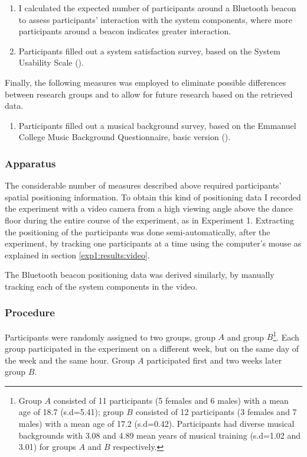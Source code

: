 \documentclass[a4paper,11pt]{article}
\begin{document}
{\begin{enumerate}[resume]
	\item \label{measure:system} I calculated the expected number of participants around a Bluetooth beacon to assess participants' interaction with the system components, where more participants around a beacon indicates greater interaction.
	\item \label{measure:survey:usability} Participants filled out a system satisfaction survey, based on the System Usability Scale (\cite{brooke96}).
\end{enumerate}
Finally, the following measures was employed to eliminate possible differences between research groups and to allow for future research based on the retrieved data.
\begin{enumerate}[resume]
	\item \label{measure:survey:musical} Participants filled out a musical background survey, based on the Emmanuel College Music Background Questionnaire, basic version (\cite{web:zhao12}).
\end{enumerate}

\subsubsection{Apparatus}\label{aparatus}

The considerable number of measures described above required participants' spatial positioning information.
To obtain this kind of positioning data I recorded the experiment with a video camera from a high viewing angle above the dance floor during the entire course of the experiment, as in Experiment 1.
Extracting the positioning of the participants was done semi-automatically, after the experiment, by tracking one participants at a time using the computer's mouse as explained in section \ref{exp1:results:video}.

The Bluetooth beacon positioning data was derived similarly, by manually tracking each of the system components in the video.

\subsubsection{Procedure}

Participants were randomly assigned to two groups, group $A$ and group $B$\@\footnote{Group $A$ consisted of 11 participants (5 females and 6 males) with a mean age of 18.7 (s.d=5.41); group $B$ consisted of 12 participants (3 females and 7 males) with a mean age of 17.2 (s.d=0.42). Participants had diverse musical backgrounds with 3.08 and 4.89 mean years of musical training (s.d=1.02 and 3.01) for groups $A$ and $B$ respectively.}.
Each group participated in the experiment on a different week, but on the same day of the week and the same hour. Group $A$ participated first and two weeks later group $B$.

}
\end{document}
